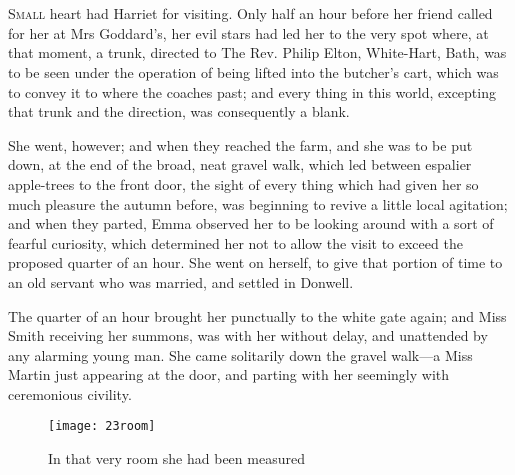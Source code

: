 \chapter[Chapter \thechapter]{}
\lettrine[lines=4,lraise=0.3]{S}{mall} heart had Harriet for visiting. Only half an hour before her friend called for her at Mrs Goddard's, her evil stars had led her to the very spot where, at that moment, a trunk, directed to The Rev. Philip Elton, White-Hart, Bath, was to be seen under the operation of being lifted into the butcher's cart, which was to convey it to where the coaches past; and every thing in this world, excepting that trunk and the direction, was consequently a blank.

She went, however; and when they reached the farm, and she was to be put down, at the end of the broad, neat gravel walk, which led between espalier apple-trees to the front door, the sight of every thing which had given her so much pleasure the autumn before, was beginning to revive a little local agitation; and when they parted, Emma observed her to be looking around with a sort of fearful curiosity, which determined her not to allow the visit to exceed the proposed quarter of an hour. She went on herself, to give that portion of time to an old servant who was married, and settled in Donwell.

The quarter of an hour brought her punctually to the white gate again; and Miss Smith receiving her summons, was with her without delay, and unattended by any alarming young man. She came solitarily down the gravel walk—a Miss Martin just appearing at the door, and parting with her seemingly with ceremonious civility.

\begin{figure}[tbph]
\centering
\texttt{[image: 23room]}
\caption{In that very room she had been measured}
\end{figure}

